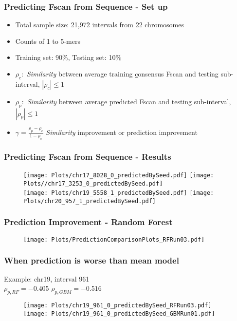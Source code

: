 \documentclass[10pt,dvipsnames,table]{beamer}
\begin{document}
\begin{frame}
\frametitle{Predicting Fscan from Sequence - Set up}
\begin{itemize}
\item Total sample size: 21,972 intervals from 22 chromosomes
\item Counts of 1 to 5-mers
\item Training set: 90\%, Testing set: 10\%
\item $\rho_{c}:$ {\emph{Similarity}} between average training {\underline{c}}onsensus Fscan and testing sub-interval, $|\rho_{c}| \leq 1$
\item $\rho_{p}:$ {\emph{Similarity}} between average {\underline{p}}redicted Fscan and testing sub-interval, $|\rho_{p}| \leq 1$
\item $\gamma = \frac{\rho_{p} - \rho_{c}}{1 - \rho_{c}} $ {\emph{Similarity}} improvement or prediction improvement
\end{itemize}
\end{frame}

\begin{frame}
\frametitle{Predicting Fscan from Sequence - Results}
\vspace{-0.5cm}
\begin{figure}
\texttt{[image: Plots/chr17\_8028\_0\_predictedBySeed.pdf]}
\hspace{0.5cm}
\texttt{[image: Plots//chr17\_3253\_0\_predictedBySeed.pdf]} \\
\texttt{[image: Plots/chr19\_5558\_1\_predictedBySeed.pdf]}
\hspace{0.5cm}
\texttt{[image: Plots/chr20\_957\_1\_predictedBySeed.pdf]}
\end{figure}
\end{frame}

\begin{frame}
\frametitle{Prediction Improvement - Random Forest}
\vspace{-0.5cm}
\begin{figure}
\texttt{[image: Plots/PredictionComparisonPlots\_RFRun03.pdf]}
\end{figure}
\end{frame}

\begin{frame}
\frametitle{When prediction is worse than mean model}
Example: chr19, interval 961 \\
 $\rho_{p, RF} = -0.405$ \hspace{1.5in} $\rho_{p, GBM} = -0.516$
\begin{figure}
\texttt{[image: Plots/chr19\_961\_0\_predictedBySeed\_RFRun03.pdf]}
\texttt{[image: Plots/chr19\_961\_0\_predictedBySeed\_GBMRun01.pdf]}
\end{figure}
\end{frame}
\end{document}
